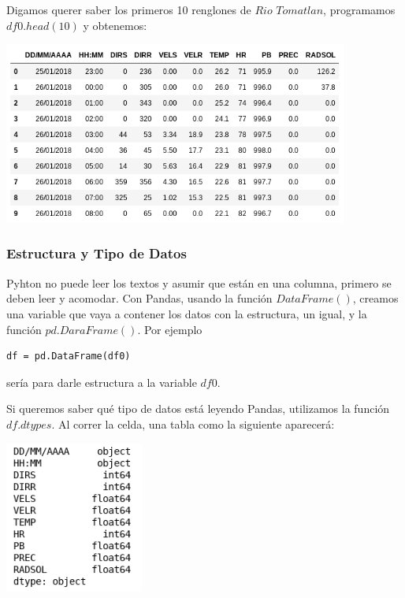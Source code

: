 \documentclass{article}
\begin{document}
    Digamos querer saber los primeros 10 renglones de $Rio$ $Tomatlan$, programamos $df0.head(10)$ y obtenemos:
    
    \begin{center}
    \includegraphics[height=6cm]{head.png}
	\end{center}
    
\subsubsection{Estructura y Tipo de Datos}
Pyhton no puede leer los textos y asumir que están en una columna, primero se deben leer y acomodar. Con Pandas, usando la función $DataFrame()$, creamos una variable que vaya a contener los datos con la estructura, un igual, y la función $pd.DaraFrame()$. Por ejemplo
    
    \begin{verbatim}df = pd.DataFrame(df0) \end{verbatim} sería para darle estructura a la variable $df0$.
    
    Si queremos saber qué tipo de datos está leyendo Pandas, utilizamos la función $df.dtypes$. Al correr la celda, una tabla como la siguiente aparecerá:
    
    \begin{center}
    \includegraphics[height=5cm]{types.png}
    \end{center}
    
\end{document}
